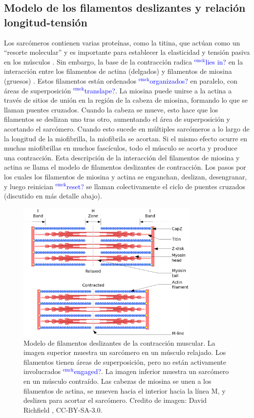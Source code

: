 \documentclass[12pt]{article}
\newcommand{\emck}[1]{\textcolor{blue}{$^{\textrm{emck}}${#1}}}
\begin{document}
\subsection*{Modelo de los filamentos deslizantes y relación longitud-tensión}
Los sarcómeros contienen varias proteínas, como la titina, que actúan
como un ``resorte molecular'' y es importante para establecer la
elasticidad y tensión pasiva en los músculos \cite{granzier2006giant}.
Sin embargo, la base de la contracción radica \emck{lies in?} en la
interacción entre los filamentos de actina (delgados) y filamentos de
miosina (gruesos) \cite{openStax2016contraction}. Estos filamentos
están ordenados \emck{organizados?} en paralelo, con áreas de
superposición \emck{translape?}. La miosina puede unirse a la actina a
través de sitios de unión en la región de la cabeza de miosina,
formando lo que se llaman puentes cruzados. Cuando la cabeza se mueve,
esto hace que los filamentos se deslizan uno tras otro, aumentando el
área de superposición y acortando el sarcómero. Cuando esto sucede en
múltiples sarcómeros a lo largo de la longitud de la miofibrilla, la
miofibrila se acortan. Si el mismo efecto ocurre en muchas
miofibrillas en muchos fascículos, todo el músculo se acorta y produce
una contracción. Esta descripción de la interacción del filamentos de
miosina y actina se llama el modelo de filamentos deslizantes de
contracción. Los pasos por los cuales los filamentos de miosina y
actina se enganchan, deslizan, desengranar, y luego reinician
\emck{reset?} se llaman colectivamente el ciclo de puentes cruzados
\cite{openStax2016contraction} (discutido en más detalle abajo).
  
\vspace{0.2cm}

\begin{figure}[h!]
\centering
\includegraphics[width=0.8\textwidth]{figures/sarcomere.png}
\caption{Modelo de filamentos deslizantes de la contracción
  muscular. La imagen superior muestra un sarcómero en un músculo
  relajado. Los filamentos tienen áreas de superposición, pero no
  están activamente involucrados \emck{engaged?}. La imagen inferior
  muestra un sarcómero en un músculo contraído. Las cabezas de miosina
  se unen a los filamentos de actina, se mueven hacia el interior
  hacia la línea M, y deslizen para acortar el sarcómero. Credito de
  imagen: David Richfield \cite{richfieldSarcomere}, CC-BY-SA-3.0.}
\label{fig:sarcomere}
\end{figure}
\end{document}
